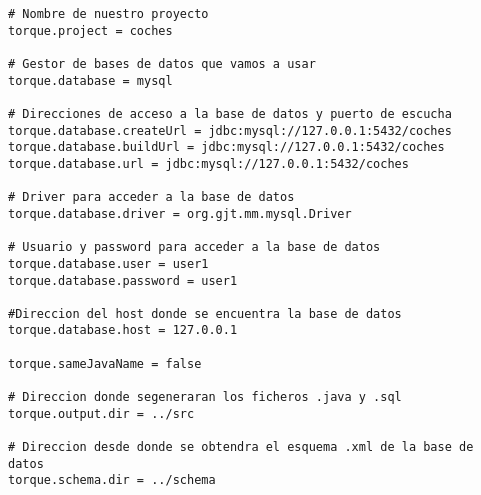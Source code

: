 \begin{lstlisting}
# Nombre de nuestro proyecto
torque.project = coches

# Gestor de bases de datos que vamos a usar
torque.database = mysql

# Direcciones de acceso a la base de datos y puerto de escucha
torque.database.createUrl = jdbc:mysql://127.0.0.1:5432/coches
torque.database.buildUrl = jdbc:mysql://127.0.0.1:5432/coches
torque.database.url = jdbc:mysql://127.0.0.1:5432/coches

# Driver para acceder a la base de datos
torque.database.driver = org.gjt.mm.mysql.Driver

# Usuario y password para acceder a la base de datos
torque.database.user = user1
torque.database.password = user1

#Direccion del host donde se encuentra la base de datos
torque.database.host = 127.0.0.1

torque.sameJavaName = false

# Direccion donde segeneraran los ficheros .java y .sql
torque.output.dir = ../src

# Direccion desde donde se obtendra el esquema .xml de la base de datos
torque.schema.dir = ../schema
\end{lstlisting}